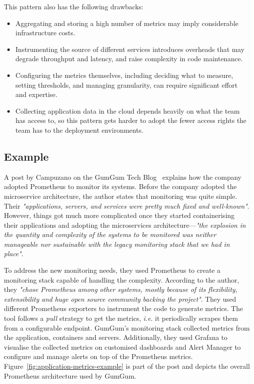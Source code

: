 \documentclass[runningheads]{llncs}
\begin{document}
\noindent This pattern also has the following drawbacks:
\begin{itemize}
    \item Aggregating and storing a high number of metrics may imply considerable infrastructure costs.
    \item Instrumenting the source of different services introduces overheads that may degrade throughput and latency, and raise complexity in code maintenance.     
    \item Configuring the metrics themselves, including deciding what to measure, setting thresholds, and managing granularity, can require significant effort and expertise.
    \item Collecting application data in the cloud depends heavily on what the team has access to, so this pattern gets harder to adopt the fewer access rights the team has to the deployment environments.
\end{itemize}

\subsection{Example}

A post by Campuzano on the GumGum Tech Blog~\cite{Campuzano-2019} explains how the company adopted Prometheus to monitor its systems. Before the company adopted the microservice architecture, the author states that monitoring was quite simple. Their \textit{"applications, servers, and services were pretty much fixed and well-known"}. However, things got much more complicated once they started containerising their applications and adopting the microservices architecture---\textit{"the explosion in the quantity and complexity of the systems to be monitored was neither manageable nor sustainable with the legacy monitoring stack that we had in place"}.

To address the new monitoring needs, they used Prometheus to create a monitoring stack capable of handling the complexity. According to the author, they \textit{"chose Prometheus among other systems, mostly because of its flexibility, extensibility and huge open source community backing the project"}. They used different Prometheus exporters to instrument the code to generate metrics. The tool follows a \textit{pull} strategy to get the metrics, \textit{i.e.} it periodically scrapes them from a configurable endpoint. GumGum's monitoring stack collected metrics from the application, containers and servers. Additionally, they used Grafana to visualise the collected metrics on customised dashboards and Alert Manager to configure and manage alerts on top of the Prometheus metrics. Figure~\ref{fig:application-metrics-example} is part of the post and depicts the overall Prometheus architecture used by GumGum.
\end{document}
